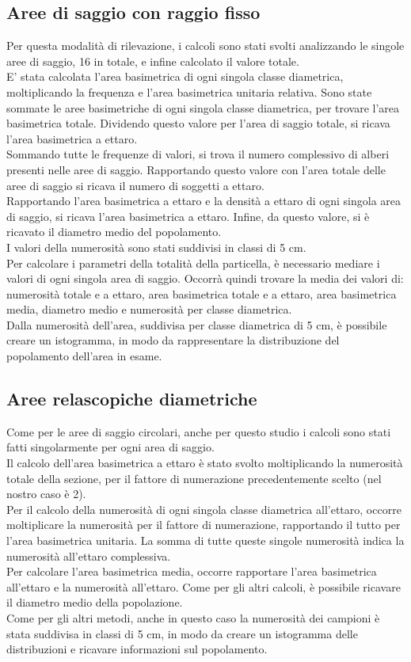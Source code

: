 \subsection{Aree di saggio con raggio fisso}
Per questa modalità di rilevazione, i calcoli sono stati svolti analizzando le singole aree di saggio, 16 in totale, e infine calcolato il valore totale.\\
E' stata calcolata l'area basimetrica di ogni singola classe diametrica, moltiplicando la frequenza e l'area basimetrica unitaria relativa. Sono state sommate le aree basimetriche di ogni singola  classe diametrica, per trovare l'area basimetrica totale. Dividendo questo valore per l'area di saggio totale, si ricava l'area basimetrica a ettaro.\\
Sommando tutte le frequenze di valori, si trova il numero complessivo di alberi presenti nelle aree di saggio. Rapportando questo valore con l'area totale delle aree di saggio si ricava il numero di soggetti a ettaro.\\
Rapportando l'area basimetrica a ettaro e la densità a ettaro di ogni singola area di saggio, si ricava l'area basimetrica a ettaro. Infine, da questo valore, si è ricavato il diametro medio del popolamento.\\
I valori della numerosità sono stati suddivisi in classi di 5 cm.\\
Per calcolare i parametri della totalità della particella, è necessario mediare i valori di ogni singola area di saggio. Occorrà quindi trovare la media dei valori di: numerosità totale e a ettaro, area basimetrica totale e a ettaro, area basimetrica media, diametro medio e numerosità per classe diametrica.\\
Dalla numerosità dell'area, suddivisa per classe diametrica di 5 cm, è possibile creare un istogramma, in modo da rappresentare la distribuzione del popolamento dell'area in esame.\\
\subsection{Aree relascopiche diametriche}
Come per le aree di saggio circolari, anche per questo studio i calcoli sono stati fatti singolarmente per ogni area di saggio.\\
Il calcolo dell'area basimetrica a ettaro è stato svolto moltiplicando la numerosità totale della sezione, per il fattore di numerazione precedentemente scelto (nel nostro caso è 2).\\
Per il calcolo della numerosità di ogni singola classe diametrica all'ettaro, occorre moltiplicare la numerosità per il fattore di numerazione, rapportando il tutto per l'area basimetrica unitaria. La somma di tutte queste singole  numerosità indica la numerosità all'ettaro complessiva.\\
Per calcolare l'area basimetrica media, occorre rapportare l'area basimetrica all'ettaro e la numerosità all'ettaro. Come per gli altri calcoli, è possibile ricavare il diametro medio della popolazione.\\
Come per gli altri metodi, anche in questo caso la numerosità dei campioni è stata suddivisa in classi di 5 cm, in modo da creare un istogramma delle distribuzioni e ricavare informazioni sul popolamento.
